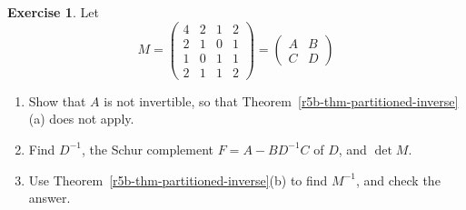\documentclass[12pt]{article}
\theoremstyle{definition}
\newtheorem{exercise}{Exercise}
\begin{document}
\begin{exercise}\label{r5b-dr-partitioned-inverse}
Let
\[
M=\left(\begin{array}{cc|cc}4&2&1&2\\2&1&0&1\\\hline1&0&1&1\\2&1&1&2\end{array}\right)
=\begin{pmatrix}A&B\\C&D\end{pmatrix}
\]
\begin{enumerate}
\item Show that \(A\) is not invertible, so that Theorem~\ref{r5b-thm-partitioned-inverse}(a) does not apply.
\item Find \(D^{-1}\), the Schur complement \(F=A-BD^{-1}C\) of \(D\), and \(\det M\).
\item Use Theorem~\ref{r5b-thm-partitioned-inverse}(b) to find \(M^{-1}\), and check the answer.
\end{enumerate}
\end{exercise}
\end{document}
